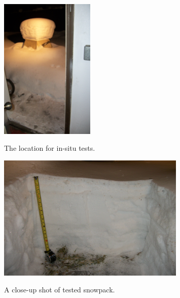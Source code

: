 \begin{figure}[h]
\centering
\includegraphics[width=0.4\textwidth]{fig/insitu_location.jpg}
\label{fig:insitu_location}
\caption{The location for in-situ tests.}
\end{figure}

\begin{figure}[h]
\centering
\includegraphics[width=0.8\textwidth]{fig/snowpack.jpg}
\label{fig:snowpack}
\caption{A close-up shot of tested snowpack.}
\end{figure}

